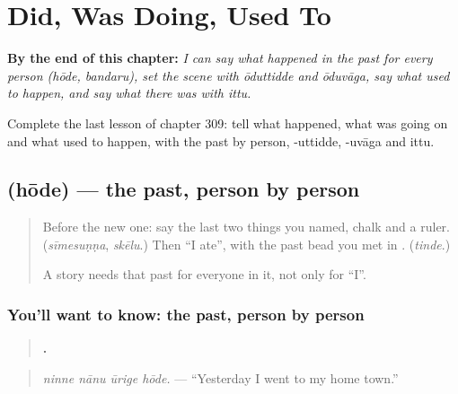 
\chapter{Did, Was Doing, Used To}
\label{ch:ka-did-was-doing-used-to}

\begin{chapteropening}
\textbf{By the end of this chapter:} \emph{I can say what happened in the past for every person (hōde, bandaru), set the scene with ōduttidde and ōduvāga, say what used to happen, and say what there was with ittu.}

Complete the last lesson of chapter 309: tell what happened, what was going on and what used to happen, with the past by person, -uttidde, -uvāga and ittu.
\end{chapteropening}

\section[\texorpdfstring{\kn{ಹೋದೆ} (hōde)}{ಹೋದೆ (hōde)}]{ (hōde) — the past, person by person}

\label{lesson:KA-C309-hode}



\begin{quote}
Before the new one: say the last two things you named, chalk and a ruler. (\emph{sīmesuṇṇa}, \emph{skēlu}.) Then \textquotedblleft{}I ate\textquotedblright{}, with the past bead you met in \textbf{}. (\emph{tinde}.)

A story needs that past for everyone in it, not only for \textquotedblleft{}I\textquotedblright{}.
\end{quote}

\subsection*{You'll want to know: the past, person by person}
\begin{quote}
\textbf{   .}
\end{quote}

\begin{quote}
\emph{ninne nānu ūrige hōde.} — \textquotedblleft{}Yesterday I went to my home town.\textquotedblright{}
\end{quote}

